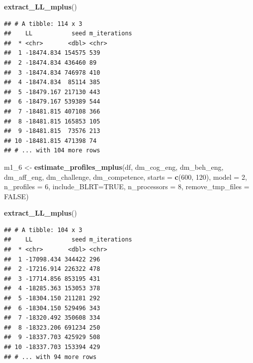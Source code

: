 \documentclass[]{book}
\newenvironment{Shaded}{\begin{snugshade}}{\end{snugshade}}
\newcommand{\KeywordTok}[1]{\textcolor[rgb]{0.13,0.29,0.53}{\textbf{#1}}}
\newcommand{\DataTypeTok}[1]{\textcolor[rgb]{0.13,0.29,0.53}{#1}}
\newcommand{\DecValTok}[1]{\textcolor[rgb]{0.00,0.00,0.81}{#1}}
\newcommand{\StringTok}[1]{\textcolor[rgb]{0.31,0.60,0.02}{#1}}
\newcommand{\OtherTok}[1]{\textcolor[rgb]{0.56,0.35,0.01}{#1}}
\newcommand{\NormalTok}[1]{#1}
\begin{document}
\begin{Shaded}
\begin{Highlighting}[]
\KeywordTok{extract_LL_mplus}\NormalTok{()}
\end{Highlighting}
\end{Shaded}

\begin{verbatim}
## # A tibble: 114 x 3
##    LL           seed m_iterations
##  * <chr>       <dbl> <chr>       
##  1 -18474.834 154575 539         
##  2 -18474.834 436460 89          
##  3 -18474.834 746978 410         
##  4 -18474.834  85114 385         
##  5 -18479.167 217130 443         
##  6 -18479.167 539389 544         
##  7 -18481.815 407108 366         
##  8 -18481.815 165853 105         
##  9 -18481.815  73576 213         
## 10 -18481.815 471398 74          
## # ... with 104 more rows
\end{verbatim}

\begin{Shaded}
\begin{Highlighting}[]
\NormalTok{m1_}\DecValTok{6}\NormalTok{ <-}\StringTok{ }\KeywordTok{estimate_profiles_mplus}\NormalTok{(df,  }
\NormalTok{                             dm_cog_eng, dm_beh_eng, dm_aff_eng, dm_challenge, dm_competence,}
                             \DataTypeTok{starts =} \KeywordTok{c}\NormalTok{(}\DecValTok{600}\NormalTok{, }\DecValTok{120}\NormalTok{),}
                             \DataTypeTok{model =} \DecValTok{2}\NormalTok{,}
                             \DataTypeTok{n_profiles =} \DecValTok{6}\NormalTok{,}
                             \DataTypeTok{include_BLRT=}\OtherTok{TRUE}\NormalTok{,}
                             \DataTypeTok{n_processors =} \DecValTok{8}\NormalTok{, }\DataTypeTok{remove_tmp_files =} \OtherTok{FALSE}\NormalTok{)}

\KeywordTok{extract_LL_mplus}\NormalTok{()}
\end{Highlighting}
\end{Shaded}

\begin{verbatim}
## # A tibble: 104 x 3
##    LL           seed m_iterations
##  * <chr>       <dbl> <chr>       
##  1 -17098.434 344422 296         
##  2 -17216.914 226322 478         
##  3 -17714.856 853195 431         
##  4 -18285.363 153053 378         
##  5 -18304.150 211281 292         
##  6 -18304.150 529496 343         
##  7 -18320.492 350608 334         
##  8 -18323.206 691234 250         
##  9 -18337.703 425929 508         
## 10 -18337.703 153394 429         
## # ... with 94 more rows
\end{verbatim}
\end{document}
